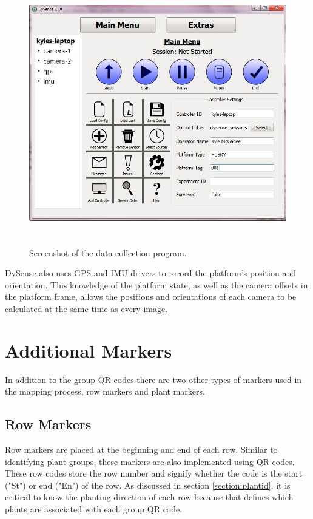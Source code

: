 \begin{figure}[htb]
	\centering
    \includegraphics[height=4.5in]{figures/dysense2.jpg}
    \caption[Data collection program]{Screenshot of the data collection program.}
    \label{dysense_screenshot}
\end{figure}

DySense also uses GPS and IMU drivers to record the platform's position and orientation.  This knowledge of the platform state, as well as the camera offsets in the platform frame, allows the positions and orientations of each camera to be calculated at the same time as every image.    

\section{Additional Markers}
\label{system-markers}

In addition to the group QR codes there are two other types of markers used in the mapping process, row markers and plant markers.   

\subsection{Row Markers}

Row markers are placed at the beginning and end of each row. Similar to identifying plant groups, these markers are also implemented using QR codes.  These row codes store the row number and signify whether the code is the start ("St") or end ("En") of the row. As discussed in section \ref{section:plantid}, it is critical to know the planting direction of each row because that defines which plants are associated with each group QR code.

